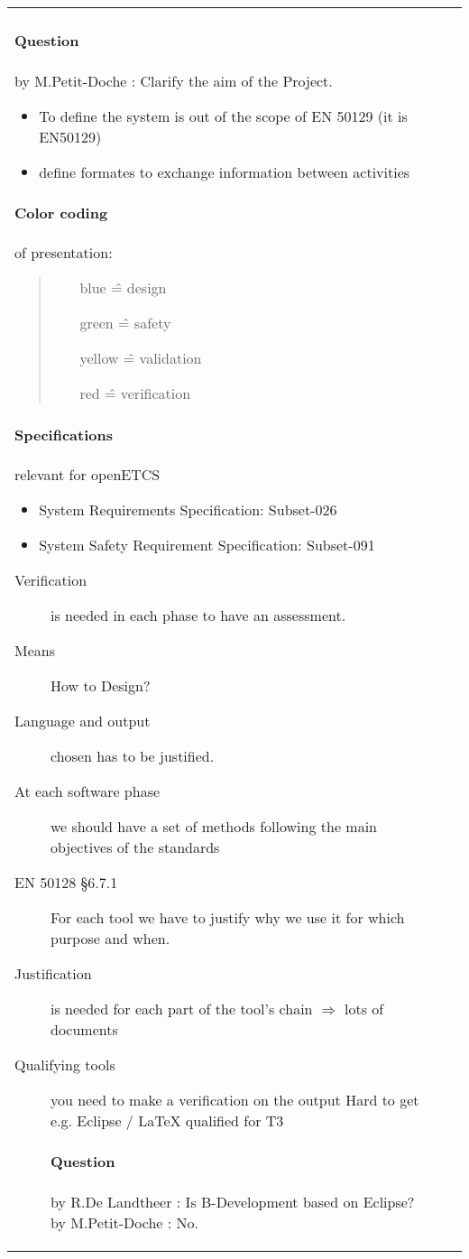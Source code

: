 \documentclass[a4paper]{article}
\newcommand{\Q}[2]{\paragraph{Question} 
	\ifthenelse{\isempty{#1}}%
    	{}%
    	{by #1}%
    : #2}
\newcommand{\A}[2]{\newline{\textbf{Answer}}
	\ifthenelse{\isempty{#1}}%
    	{}%
    	{by #1}%
    : #2}
\begin{document}
\begin{longtable}{|p{}|p{}|p{}|}
\Q{M.Petit-Doche}{Clarify the aim of the Project.}


\begin{itemize}
	\item To define the system is out of the scope of EN 50129 (it is EN50129)
	\item define formates to exchange information between activities
\end{itemize}	

\paragraph{Color coding} of presentation:
\begin{quote}
	\begin{itemize}
		\item [blue] \^{=} design
		\item [green] \^{=} safety
		\item [yellow] \^{=} validation
		\item [red] \^{=} verification
	\end{itemize}
\end{quote}

\paragraph{Specifications} relevant for openETCS 
\begin{itemize}
	\item System Requirements Specification: Subset-026 
	\item System Safety Requirement Specification: Subset-091
\end{itemize}


\begin{description}
	\item [Verification] is needed in each phase to have an assessment.
	\item [Means] How to Design?
	\item [Language and output] chosen has to be justified.
	\item [At each software phase] we should have a set of methods following the main objectives of the standards
	\item [EN 50128 \S 6.7.1] For each tool we have to justify why we use it for which purpose and when.
	\item [Justification] is needed for each part of the tool's chain $\Rightarrow$ lots of documents
	\item [Qualifying tools] you need to make a verification on the output \newline Hard to get e.g. Eclipse / LaTeX qualified for T3
	\Q{R.De Landtheer}{Is B-Development based on Eclipse?} 
	\A{M.Petit-Doche}{No.}
\end{description}


\end{longtable}
\end{document}
